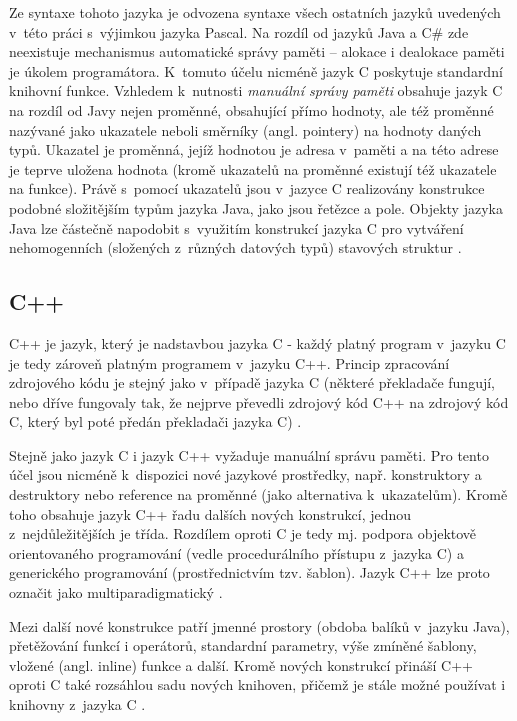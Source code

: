 \documentclass{bakalarka}
\begin{document}
Ze syntaxe tohoto jazyka je odvozena syntaxe všech ostatních jazyků uvedených v~této práci s~výjimkou jazyka Pascal. Na rozdíl od jazyků Java a C\# zde neexistuje mechanismus automatické správy paměti – alokace i dealokace paměti je úkolem programátora. K~tomuto účelu nicméně jazyk C poskytuje standardní knihovní funkce. Vzhledem k~nutnosti \textit{manuální správy paměti} obsahuje jazyk C na rozdíl od Javy nejen proměnné, obsahující přímo hodnoty, ale též proměnné nazývané jako ukazatele neboli směrníky (angl. pointery) na hodnoty daných typů. Ukazatel je proměnná, jejíž hodnotou je adresa v~paměti a na této adrese je teprve uložena hodnota (kromě ukazatelů na proměnné existují též ukazatele na funkce). Právě s~pomocí ukazatelů jsou v~jazyce C realizovány konstrukce podobné složitějším typům jazyka Java, jako jsou řetězce a pole. Objekty jazyka Java lze částečně napodobit s~využitím konstrukcí jazyka C pro vytváření nehomogenních (složených z~různých datových typů) stavových struktur \cite{c-book, c-guide}.

\subsection{C++}
C++ je jazyk, který je nadstavbou jazyka C - každý platný program v~jazyku C je tedy zároveň platným programem v~jazyku C++. Princip zpracování zdrojového kódu je stejný jako v~případě jazyka C (některé překladače fungují, nebo dříve fungovaly tak, že nejprve převedli zdrojový kód C++ na zdrojový kód C, který byl poté předán překladači jazyka C) \cite{cpp-book}.\par
Stejně jako jazyk C i jazyk C++ vyžaduje manuální správu paměti. Pro tento účel jsou nicméně k~dispozici nové jazykové prostředky, např. konstruktory a destruktory nebo reference na proměnné (jako alternativa k~ukazatelům). Kromě toho obsahuje jazyk C++ řadu dalších nových konstrukcí, jednou z~nejdůležitějších je třída. Rozdílem oproti C je tedy mj. podpora objektově orientovaného programování (vedle procedurálního přístupu z~jazyka C) a generického programování (prostřednictvím tzv. šablon). Jazyk C++ lze proto označit jako multiparadigmatický \cite{cpp-book, cpp-guide-classes}.\par
Mezi další nové konstrukce patří jmenné prostory (obdoba balíků v~jazyku Java), přetěžování funkcí i operátorů, standardní parametry, výše zmíněné šablony, vložené (angl. inline) funkce a další. Kromě nových konstrukcí přináší C++ oproti C také rozsáhlou sadu nových knihoven, přičemž je stále možné používat i knihovny z~jazyka C \cite{cpp-book}.\par
\end{document}
